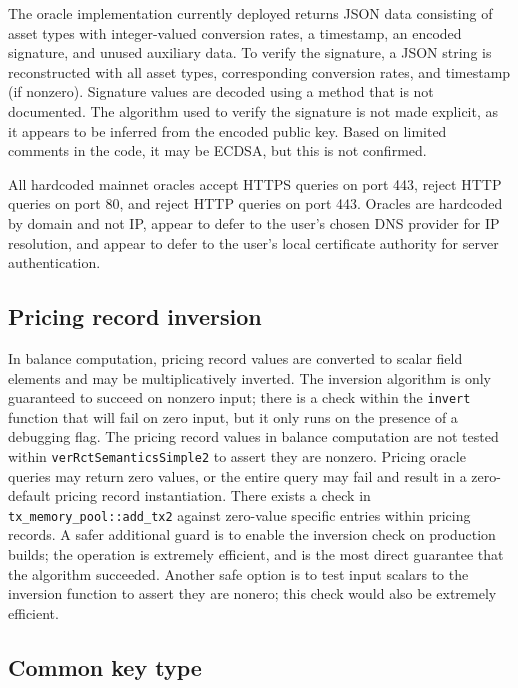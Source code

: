 \documentclass{article}
\begin{document}
The oracle implementation currently deployed returns JSON data consisting of asset types with integer-valued conversion rates, a timestamp, an encoded signature, and unused auxiliary data.
To verify the signature, a JSON string is reconstructed with all asset types, corresponding conversion rates, and timestamp (if nonzero).
Signature values are decoded using a method that is not documented.
The algorithm used to verify the signature is not made explicit, as it appears to be inferred from the encoded public key.
Based on limited comments in the code, it may be ECDSA, but this is not confirmed.

All hardcoded mainnet oracles accept HTTPS queries on port 443, reject HTTP queries on port 80, and reject HTTP queries on port 443.
Oracles are hardcoded by domain and not IP, appear to defer to the user's chosen DNS provider for IP resolution, and appear to defer to the user's local certificate authority for server authentication.


\subsection{Pricing record inversion}

In balance computation, pricing record values are converted to scalar field elements and may be multiplicatively inverted.
The inversion algorithm is only guaranteed to succeed on nonzero input; there is a check within the \texttt{invert} function that will fail on zero input, but it only runs on the presence of a debugging flag.
The pricing record values in balance computation are not tested within \texttt{verRctSemanticsSimple2} to assert they are nonzero.
Pricing oracle queries may return zero values, or the entire query may fail and result in a zero-default pricing record instantiation.
There exists a check in \texttt{tx\_memory\_pool::add\_tx2} against zero-value specific entries within pricing records.
A safer additional guard is to enable the inversion check on production builds; the operation is extremely efficient, and is the most direct guarantee that the algorithm succeeded.
Another safe option is to test input scalars to the inversion function to assert they are nonero; this check would also be extremely efficient.


\subsection{Common key type}
\label{obs:common-key-type}
\end{document}
